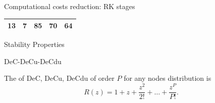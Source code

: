 \documentclass[9pt,compress,t,aspectratio=169]{beamer}
\begin{document}
\begin{frame}{Computational costs reduction: RK stages}
\begin{minipage}{0.49\textwidth}
{\begin{tabular}{|c|c||c|c|c|}
				13  &     7  &   85 &  70  &   64 \\  \hline		
			\end{tabular}
		}
	\end{minipage}
	\end{frame}
	
	\begin{frame}{Stability Properties}
		\begin{minipage}{0.49\textwidth}
		\begin{block}{DeC-DeCu-DeCdu}
			\begin{center}
				The  of DeC, DeCu, DeCdu of order $P$ for any nodes distribution is
				\begin{equation*}
					R(z) = 1 + z + \frac{z^2}{2!} +\dots +\frac{z^P}{P!}.
				\end{equation*}
			\end{center}
		\end{block}
		\end{minipage}\hfill
	\begin{minipage}{0.49\textwidth}
		\centering 
\end{minipage}
\end{frame}
\end{document}
